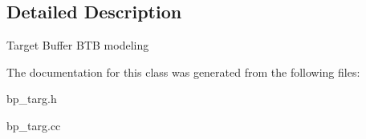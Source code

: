 \subsection{Detailed Description}
Target Buffer BTB modeling 

The documentation for this class was generated from the following files:\begin{DoxyCompactItemize}
\item 
bp\_\-targ.h\item 
bp\_\-targ.cc\end{DoxyCompactItemize}
